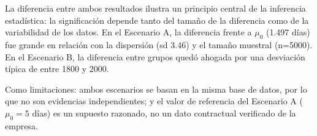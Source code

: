 \documentclass[11pt, a4paper]{article}
\begin{document}
La diferencia entre ambos resultados ilustra un principio central de la inferencia 
estadística: la significación depende tanto del tamaño de la diferencia como de la 
variabilidad de los datos. En el Escenario A, la diferencia frente a $\mu_0$ (1.497 días) 
fue grande en relación con la dispersión (sd 3.46) y el tamaño muestral (n=5000). En el 
Escenario B, la diferencia entre grupos quedó ahogada por una desviación 
típica de entre 1800 y 2000.

Como limitaciones: ambos escenarios se basan en la misma base de datos, por lo que no son 
evidencias independientes; y el valor de referencia del Escenario A ($\mu_0=5$ días) es un 
supuesto razonado, no un dato contractual verificado de la empresa.
\end{document}
